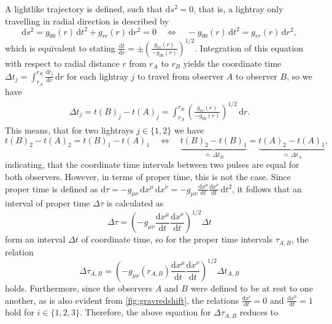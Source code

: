 \documentclass[a4paper,11pt]{article}
\numberwithin{equation}{section}
\begin{document}
{A lightlike trajectory is defined, such that $\mathrm{d}s^2 = 0$, that is, a lightray only travelling in radial direction is described by \begin{equation}
\mathrm{d}s^2 = g_{00}(r)\,\mathrm{d}t^2 + g_{rr}(r)\,\mathrm{d}r^2 = 0 \quad \Leftrightarrow \quad -g_{00}(r)\,\mathrm{d}t^2 = g_{rr}(r)\,\mathrm{d}r^2, 
\end{equation} which is equivalent to stating $\frac{\mathrm{d}t}{\mathrm{d}r} = \pm \left(\frac{g_{rr}(r)}{-g_{00}(r)}\right)^{1/2}$. Integration of this equation with respect to radial distance $r$ from $r_A$ to $r_B$ yields the coordinate time $\Delta t_{j} = \int_{r_A}^{r_B}\frac{\mathrm{d}t_j}{\mathrm{d}r}\,\mathrm{d}r$ for each lightray $j$ to travel from observer $A$ to observer $B$, so we have \begin{align}\begin{aligned}
\Delta t_j = t(B)_j-t(A)_j = \int_{r_A}^{r_B} \left(\frac{g_{rr}(r)}{-g_{00}(r)}\right)^{1/2} \,\mathrm{d}r.
\end{aligned}\end{align} This means, that for two lightrays $j \in \{1,2\}$ we have \begin{equation}
t(B)_2-t(A)_2 = t(B)_1-t(A)_1 \quad \Leftrightarrow \quad \underbrace{t(B)_2-t(B)_1}_{\doteq\,\Delta t_B} = \underbrace{t(A)_2-t(A)_1}_{\doteq\,\Delta t_A},
\end{equation} indicating, that the coordinate time intervals between two pulses are equal for both observers. However, in terms of proper time, this is not the case. Since proper time is defined as $\mathrm{d}\tau = -g_{\mu\nu}\,\mathrm{d}x^\mu\,\mathrm{d}x^\nu = -g_{\mu\nu}\frac{\mathrm{d}x^\mu}{\mathrm{d}t}\frac{\mathrm{d}x^\nu}{\mathrm{d}t}\,\mathrm{d}t^2$, it follows that an interval of proper time $\Delta \tau$ is calculated as \begin{equation}
\Delta \tau = \left(-g_{\mu\nu}\frac{\mathrm{d}x^\mu}{\mathrm{d}t}\frac{\mathrm{d}x^\nu}{\mathrm{d}t}\right)^{1/2}\Delta t
\end{equation} form an interval $\Delta t$ of coordinate time, so for the proper time intervals $\tau_{A,B}$, the relation \begin{equation}
\Delta \tau_{A,B} = \left(-g_{\mu\nu}(r_{A,B})\frac{\mathrm{d}x^\mu}{\mathrm{d}t}\frac{\mathrm{d}x^\nu}{\mathrm{d}t}\right)^{1/2}\Delta t_{A,B}
\end{equation} holds. Furthermore, since the observers $A$ and $B$ were defined to be at rest to one another, as is also evident from \cref{fig:gravredshift}, the relations $\frac{\mathrm{d}x^i}{\mathrm{d}t} = 0$ and $\frac{\mathrm{d}x^0}{\mathrm{d}t} = 1$ hold for $i \in \{1,2,3\}$. Therefore, the above equation for $\Delta \tau_{A,B}$ reduces to \begin{equation}

\end{equation}}
\end{document}

